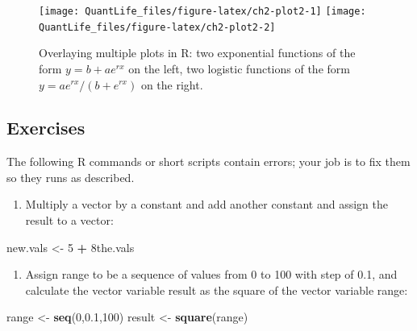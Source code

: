 \documentclass[
]{book}
\newenvironment{Shaded}{\begin{snugshade}}{\end{snugshade}}
\newcommand{\DecValTok}[1]{\textcolor[rgb]{0.00,0.00,0.81}{#1}}
\newcommand{\FloatTok}[1]{\textcolor[rgb]{0.00,0.00,0.81}{#1}}
\newcommand{\KeywordTok}[1]{\textcolor[rgb]{0.13,0.29,0.53}{\textbf{#1}}}
\newcommand{\NormalTok}[1]{#1}
\newcommand{\OperatorTok}[1]{\textcolor[rgb]{0.81,0.36,0.00}{\textbf{#1}}}
\newcommand{\StringTok}[1]{\textcolor[rgb]{0.31,0.60,0.02}{#1}}
\providecommand{\tightlist}{%
  \setlength{\itemsep}{0pt}\setlength{\parskip}{0pt}}
\begin{document}
\begin{figure}

{\centering \texttt{[image: QuantLife\_files/figure-latex/ch2-plot2-1]} \texttt{[image: QuantLife\_files/figure-latex/ch2-plot2-2]} 

}

\caption{Overlaying multiple plots in R: two exponential functions of the form $y=b+ae^{rx}$ on the left, two logistic functions of the form $y= ae^{rx}/(b+e^{rx})$ on the right.}\label{fig:ch2-plot2}
\end{figure}

\hypertarget{exercises-4}{%
\subsection{Exercises}\label{exercises-4}}

The following R commands or short scripts contain errors; your job is to fix them so they runs as described.

\begin{enumerate}
\def\labelenumi{\arabic{enumi}.}
\tightlist
\item
  Multiply a vector by a constant and add another constant and assign the result to a vector:
\end{enumerate}

\begin{Shaded}
\begin{Highlighting}[]
\NormalTok{new.vals \textless{}{-}}\StringTok{ }\DecValTok{5} \OperatorTok{+}\StringTok{ }\NormalTok{8the.vals}
\end{Highlighting}
\end{Shaded}

\begin{enumerate}
\def\labelenumi{\arabic{enumi}.}
\setcounter{enumi}{1}
\tightlist
\item
  Assign range to be a sequence of values from 0 to 100 with step of 0.1, and calculate the vector variable result as the square of the vector variable range:
\end{enumerate}

\begin{Shaded}
\begin{Highlighting}[]
\NormalTok{range \textless{}{-}}\StringTok{ }\KeywordTok{seq}\NormalTok{(}\DecValTok{0}\NormalTok{,}\FloatTok{0.1}\NormalTok{,}\DecValTok{100}\NormalTok{)}
\NormalTok{result \textless{}{-}}\StringTok{ }\KeywordTok{square}\NormalTok{(range)}
\end{Highlighting}
\end{Shaded}
\end{document}
